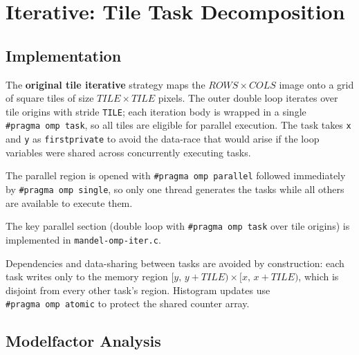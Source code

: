 \section{Iterative: Tile Task Decomposition}
\label{sec:iter-tile}

\subsection{Implementation}
\label{sec:iter-tile-impl}

The \textbf{original tile iterative} strategy maps the $\mathit{ROWS}\times\mathit{COLS}$ image
onto a grid of square tiles of size $\mathit{TILE}\times\mathit{TILE}$ pixels.
The outer double loop iterates over tile origins with stride \texttt{TILE}; each iteration
body is wrapped in a single \texttt{\#pragma~omp~task}, so all tiles are eligible for
parallel execution.
The task takes \texttt{x} and \texttt{y} as \texttt{firstprivate} to avoid the data-race
that would arise if the loop variables were shared across concurrently executing tasks.

The parallel region is opened with \texttt{\#pragma~omp~parallel} followed immediately by
\texttt{\#pragma~omp~single}, so only one thread generates the tasks while all others
are available to execute them.

The key parallel section (double loop with \texttt{\#pragma~omp~task} over tile origins) is implemented in \texttt{mandel-omp-iter.c}.

Dependencies and data-sharing between tasks are avoided by construction: each task writes
only to the memory region $[y,\,y+\mathit{TILE})\times[x,\,x+\mathit{TILE})$, which is
disjoint from every other task's region.
Histogram updates use \texttt{\#pragma~omp~atomic} to protect the shared counter array.

\subsection{Modelfactor Analysis}
\label{sec:iter-tile-mf}



